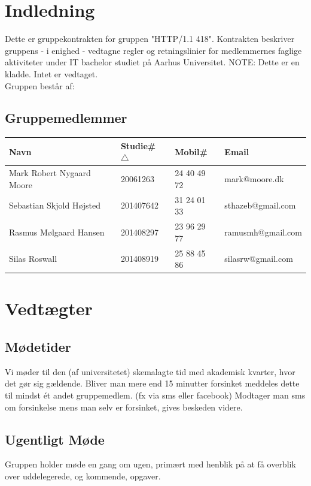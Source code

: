 \documentclass[a4paper,oneside,article]{memoir}
\date {04. februar 2015}
\begin{document}

\section{Indledning}
Dette er gruppekontrakten for gruppen "HTTP/1.1 418".
Kontrakten beskriver gruppens - i enighed - vedtagne regler og retningslinier for medlemmernes faglige aktiviteter under IT bachelor studiet på Aarhus Universitet.
NOTE: Dette er en kladde. Intet er vedtaget.\\
Gruppen består af:
\subsection{Gruppemedlemmer}
\begin{tabular}{ l | l | l | l }
    Navn & Studie\# $\triangle$ & Mobil\# & Email \\ \hline
    Mark Robert Nygaard Moore & 20061263 & 24 40 49 72 & mark@moore.dk \\ \hline
    Sebastian Skjold Højsted & 201407642 & 31 24 01 33 & sthazeb@gmail.com \\ \hline
	Rasmus Mølgaard Hansen & 201408297 & 23 96 29 77 & ramusmh@gmail.com \\ \hline
    Silas Roswall & 201408919 & 25 88 45 86 & silasrw@gmail.com
\end{tabular}
\label{subsec:medlemmer}
\section{Vedtægter}
\subsection{Mødetider}
Vi møder til den (af universitetet) skemalagte tid med akademisk kvarter, hvor det gør sig gældende.
Bliver man mere end 15 minutter forsinket meddeles dette til mindst ét andet gruppemedlem. (fx via sms eller facebook)
Modtager man sms om forsinkelse mens man selv er forsinket, gives beskeden videre.
\subsection{Ugentligt Møde}
Gruppen holder møde en gang om ugen, primært med henblik på at få overblik over uddelegerede, og kommende, opgaver.
\end{document}
